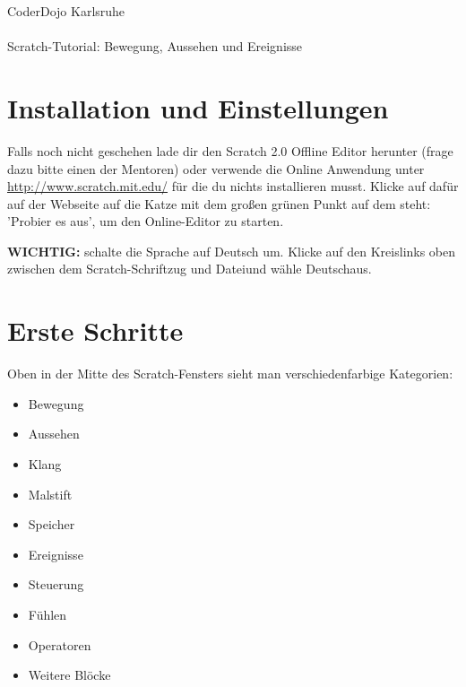 \documentclass{\VorlagenPfad/coderdojokatext}
\begin{document}
\begin{center}
{\huge CoderDojo Karlsruhe} \\ \ \\ \large{Scratch-Tutorial: Bewegung, Aussehen und Ereignisse}
\end{center}


\newcommand{\Block}[2]{\textcolor{#1}{'#2'}}
\newcommand{\SFarbe}[2]{\textcolor{#1}{#2}}
\newcommand{\KBew}{\textcolor{Bew}{Bewegung}}
\newcommand{\KAus}{\textcolor{Aus}{Aussehen}}
\newcommand{\KKla}{\textcolor{Kla}{Klang}}
\newcommand{\KMal}{\textcolor{Mal}{Malstift}}
\newcommand{\KSpe}{\textcolor{Spe}{Speicher}}
\newcommand{\KEre}{\textcolor{Ere}{Ereignisse}}
\newcommand{\KSte}{\textcolor{Ste}{Steuerung}}
\newcommand{\KFue}{\textcolor{Fue}{Fühlen}}
\newcommand{\KOpe}{\textcolor{Ope}{Operatoren}}
\newcommand{\KWei}{\textcolor{Wei}{Weitere Blöcke}}



\section{Installation und Einstellungen}
Falls noch nicht geschehen lade dir den Scratch 2.0 Offline Editor herunter (frage dazu bitte einen der Mentoren) oder verwende die Online Anwendung unter  \href{http://www.scratch.mit.edu/}{http://www.scratch.mit.edu/} für die du nichts installieren musst. Klicke auf dafür auf der Webseite auf die Katze mit dem großen grünen Punkt auf dem steht: 'Probier es aus', um den Online-Editor zu starten.


\textbf{WICHTIG:} schalte die Sprache auf Deutsch um. Klicke auf den \glqq Kreis\grqq  links oben zwischen dem Scratch-Schriftzug und \glqq Datei\grqq und wähle  \glqq Deutsch\grqq aus. 


\section{Erste Schritte}
Oben in der Mitte des Scratch-Fensters sieht man verschiedenfarbige Kategorien:
\begin{itemize}
\item \KBew
\item \KAus
\item \KKla
\item \KMal
\item \KSpe
\item \KEre
\item \KSte
\item \KFue
\item \KOpe
\item \KWei
\end{itemize}
\end{document}
